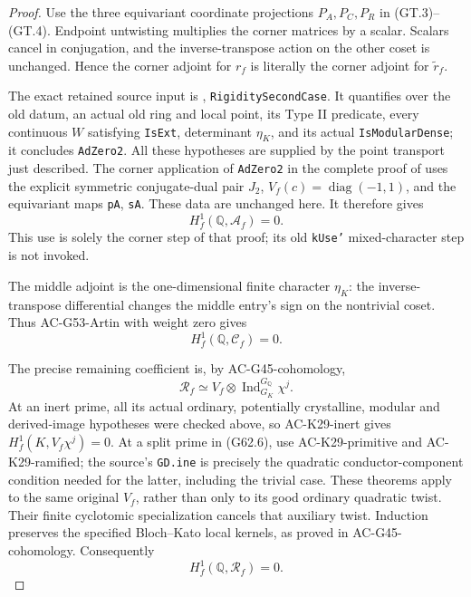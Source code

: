 \begin{proof}
Use the three equivariant coordinate projections
$P_A,P_C,P_R$ in (GT.3)--(GT.4).
Endpoint untwisting multiplies the corner
matrices by a scalar.  Scalars cancel in
conjugation, and the inverse-transpose action
on the other coset is unchanged.  Hence the
corner adjoint for $r_f$ is literally the
corner adjoint for $\widetilde r_f$.

The exact retained source input is
,
\texttt{RigiditySecondCase}.  It quantifies over
the old datum, an actual old ring and local
point, its Type II predicate, every continuous
$W$ satisfying \texttt{IsExt}, determinant
$\eta_K$, and its actual
\texttt{IsModularDense}; it concludes
\texttt{AdZero2}.  All these hypotheses are
supplied by the point transport just described.
The corner application of \texttt{AdZero2}
in the complete proof of
uses the explicit symmetric conjugate-dual pair
$J_2$, $V_f(c)=\operatorname{diag}(-1,1)$,
and the equivariant maps \texttt{pA},
\texttt{sA}.  These data are unchanged here.
It therefore gives
\[
                      H_f^1(\mathbb Q,\mathcal A_f)=0.
                                                               \tag{G62.10}
\]
This use is solely the corner step of that proof;
its old \texttt{kUse'} mixed-character step is
not invoked.

The middle adjoint is the one-dimensional
finite character $\eta_K$: the inverse-transpose
differential changes the middle entry's sign
on the nontrivial coset.  Thus
AC-G53-Artin with weight zero gives
\[
                      H_f^1(\mathbb Q,\mathcal C_f)=0.
                                                               \tag{G62.11}
\]

The precise remaining coefficient is, by
AC-G45-cohomology,
\[
 \mathcal R_f\simeq V_f\otimes
             \operatorname{Ind}_{G_K}^{G_{\mathbb Q}}\chi^j.
                                                               \tag{G62.12}
\]
At an inert prime, all its actual ordinary,
potentially crystalline, modular and
derived-image hypotheses were checked above,
so AC-K29-inert gives
$H_f^1(K,V_f\chi^j)=0$.
At a split prime in (G62.6), use
AC-K29-primitive and AC-K29-ramified; the
source's \texttt{GD.ine} is precisely the
quadratic conductor-component condition needed
for the latter, including the trivial case.
These theorems apply to the same original
$V_f$, rather than only to its good ordinary
quadratic twist.  Their finite cyclotomic
specialization cancels that auxiliary twist.
Induction preserves the specified Bloch--Kato
local kernels, as proved in AC-G45-cohomology.
Consequently
\[
                      H_f^1(\mathbb Q,\mathcal R_f)=0.
                                                               \tag{G62.13}
\]


\end{proof}
